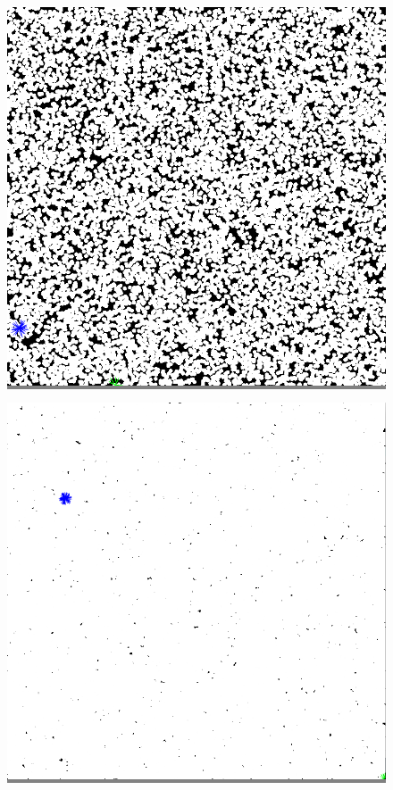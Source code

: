 \documentclass{article}
\begin{document}
\begin{figure}
\begin{minipage}{0.3\textwidth}
    \end{minipage}
    \hspace{\fill}
    \begin{minipage}{0.3\textwidth}
    \colorbox{gray}{\includegraphics[width=\linewidth]{./images/square_2.png}}
    \end{minipage}
    \vskip 0.1in
    \begin{minipage}{0.3\textwidth}
    \colorbox{gray}{\includegraphics[width=\linewidth]{./images/square_3.png}}

\end{minipage}
\end{figure}
\end{document}

